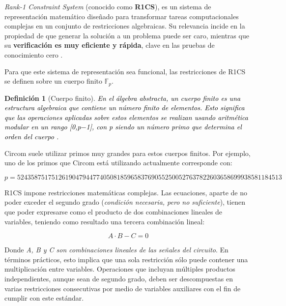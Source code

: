 \documentclass[a4paper,12pt]{report}
\newtheorem{definicion}{Definición}
\begin{document}
	\noindent \textit{Rank-1 Constraint System} (conocido como \textbf{R1CS}), es un sistema de representación matemático diseñado para transformar tareas computacionales complejas en un conjunto de restricciones algebraicas. Su relevancia incide en la propiedad de que generar la solución a un problema puede ser caro, mientras que su \textbf{verificación es muy eficiente y rápida}, clave en las pruebas de conocimiento cero \cite{R1CS_cita}.
	
	\vspace{0.25cm}
	\noindent Para que este sistema de representación sea funcional, las restricciones de R1CS se definen sobre un cuerpo finito $\mathbb{F}_p$.
	
	\vspace{0.25cm}
	\noindent 
	
	\begin{definicion}[Cuerpo finito]
		\textcolor{black}{En el álgebra abstracta, un cuerpo finito es una estructura algebraica que contiene un número finito de elementos. Esto significa que las operaciones aplicadas sobre estos elementos se realizan usando aritmética modular en un rango [0,p$-$1], con p siendo un número primo que determina el orden del cuerpo \cite{wikipedia_cuerpo_finito}.}
		
		\label{def:cuerpo-finito}
	\end{definicion}
	
	\vspace{0.25cm}
	\noindent Circom suele utilizar primos muy grandes para estos cuerpos finitos. Por ejemplo, uno de los primos que Circom está utilizando actualmente corresponde con:
	
	{\small
		\begin{equation*}
			p = 52435875175126190479447740508185965837690552500527637822603658699938581184513
	\end{equation*}}
	
	\vspace{0.25cm}
	\noindent R1CS impone restricciones matemáticas complejas. Las ecuaciones, aparte de no poder exceder el segundo grado (\textit{condición necesaria, pero no suficiente}), tienen que poder expresarse como el producto de dos combinaciones lineales de variables, teniendo como resultado una tercera combinación lineal:
	
	\begin{equation*}
		A \cdot B - C = 0
	\end{equation*}
	
	\noindent Donde \textit{A, B y C son combinaciones lineales de las señales del circuito}. En términos prácticos, esto implica que una sola restricción sólo puede contener una multiplicación entre variables. Operaciones que incluyan múltiples productos independientes, aunque sean de segundo grado, deben ser descompuestas en varias restricciones consecutivas por medio de variables auxiliares con el fin de cumplir con este estándar.
	
\end{document}
